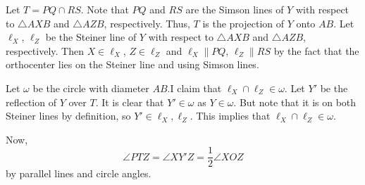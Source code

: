 Let $T=PQ\cap RS$. Note that $PQ$ and $RS$ are the Simson lines of $Y$ with respect to $\triangle{AXB}$ and $\triangle{AZB}$, respectively. Thus, $T$ is the projection of $Y$ onto $AB$. Let $\ell_X$, $\ell_Z$ be the Steiner line of $Y$ with respect to $\triangle{AXB}$ and $\triangle{AZB}$, respectively. Then $X\in\ell_X$, $Z\in\ell_Z$ and $\ell_X\parallel PQ$, $\ell_Z\parallel RS$ by the fact that the orthocenter lies on the Steiner line and using Simson lines.

Let $\omega$ be the circle with diameter $AB$.I claim that $\ell_X\cap\ell_Z\in\omega$. Let $Y'$ be the reflection of $Y$ over $T$. It is clear that $Y'\in\omega$ as $Y\in\omega$. But note that it is on both Steiner lines by definition, so $Y'\in\ell_X,\ell_Z$. This implies that $\ell_X\cap\ell_Z\in\omega$.

Now, \[\angle{PTZ}=\angle{XY'Z}=\frac{1}{2}\angle{XOZ}\] by parallel lines and circle angles.